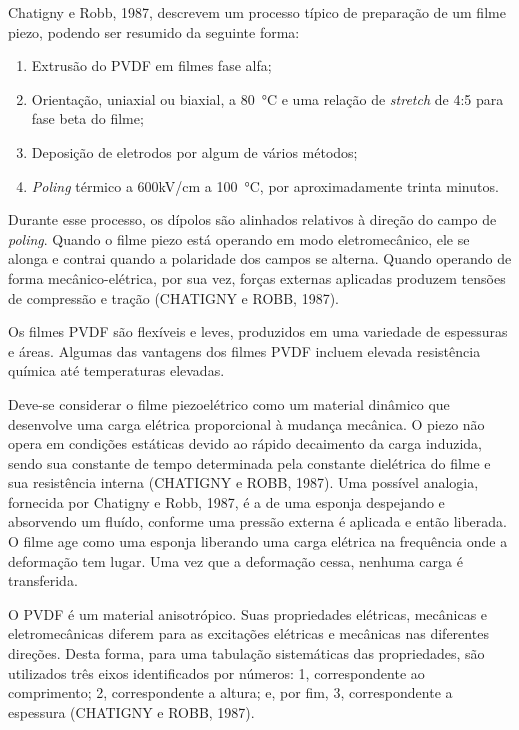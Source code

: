 \documentclass[
	12pt,				
	oneside,			
	a4paper,			
	english,			
	brazil,			
	]{abntex2ppgsi}
\begin{document}
Chatigny e Robb, 1987, descrevem um processo típico de preparação de um filme piezo, podendo ser resumido da seguinte forma:

\begin{enumerate}
	\item Extrusão do PVDF em filmes fase alfa; 
	\item Orientação, uniaxial ou biaxial, a \SI{80}{\celsius} e uma relação de \textit{stretch} de 4:5 para fase beta do filme;
	\item Deposição de eletrodos por algum de vários métodos;
	\item \textit{Poling} térmico a 600kV/cm a \SI{100}{\celsius}, por aproximadamente trinta minutos.
\end{enumerate}

Durante esse processo, os dípolos são alinhados relativos à direção do campo de \textit{poling}. Quando o filme piezo está operando em modo eletromecânico, ele se alonga e contrai quando a polaridade dos campos se alterna. Quando operando de forma mecânico-elétrica, por sua vez, forças externas aplicadas produzem tensões de compressão e tração (CHATIGNY e ROBB, 1987). 

Os filmes PVDF são flexíveis e leves, produzidos em uma variedade de espessuras e áreas. Algumas das vantagens dos filmes PVDF incluem elevada resistência química até temperaturas elevadas. 

Deve-se considerar o filme piezoelétrico como um material dinâmico que desenvolve uma carga elétrica proporcional à mudança mecânica. O piezo não opera em condições estáticas devido ao rápido decaimento da carga induzida, sendo sua constante de tempo determinada pela constante dielétrica do filme e sua resistência interna (CHATIGNY e ROBB, 1987). Uma possível analogia, fornecida por Chatigny e Robb, 1987, é a de uma esponja despejando e absorvendo um fluído, conforme uma pressão externa é aplicada e então liberada. O filme age como uma esponja liberando uma carga elétrica na frequência onde a deformação tem lugar. Uma vez que a deformação cessa, nenhuma carga é transferida. 

O PVDF é um material anisotrópico.  Suas propriedades elétricas, mecânicas e eletromecânicas diferem para as excitações elétricas e mecânicas nas diferentes direções. Desta forma, para uma tabulação sistemáticas das propriedades, são utilizados três eixos identificados por números: 1, correspondente ao comprimento; 2, correspondente a altura; e, por fim, 3, correspondente a espessura (CHATIGNY e ROBB, 1987). 
\end{document}
